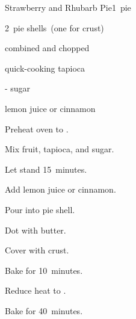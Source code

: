 \begin{recipe}{Strawberry and Rhubarb Pie}{}{1~pie}

\begin{ingredients}
\item 2~pie shells~(one for crust)
\item {} combined  and chopped 
\item \Tp{2\twothird} quick-cooking tapioca
\item \twothird{}- sugar
\item \Tp{1\half} lemon juice or \tp{\half} cinnamon
\end{ingredients}

\begin{directions}
\item Preheat oven to .
\item Mix fruit, tapioca, and sugar.
\item Let stand 15~minutes.
\item Add lemon juice or cinnamon.
\item Pour into pie shell.
\item Dot with butter.
\item Cover with crust.
\item Bake for 10~minutes.
\item Reduce heat to .
\item Bake for 40~minutes.
\end{directions}

\end{recipe}
